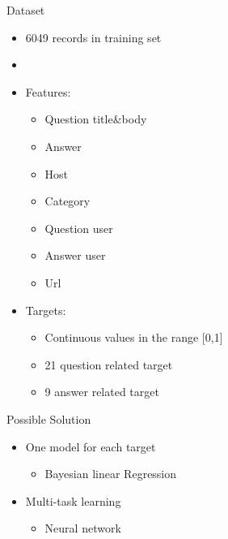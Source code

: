 \documentclass[
 size=12pt,
 paper=smartboard, %
 mode=present, %
 display=slides, %
style=tuliplab,
pauseslide,
fleqn,leqno]{powerdot}
\begin{document}
\begin{slide}{Dataset}
    \begin{itemize}
        \item 6049 records in training set
        \item 
        \item Features:
        \begin{itemize}
            \item Question title\&body
            \item Answer
            \item Host
            \item Category
            \item Question user
            \item Answer user
            \item Url
        \end{itemize}
        \item Targets:
        \begin{itemize}
            \item Continuous values in the range [0,1]
            \item 21 question related target
            \item 9 answer related target
        \end{itemize}
    \end{itemize}
\end{slide}
\begin{slide}{Possible Solution}
    \begin{itemize}
        \item One model for each target
        \begin{itemize}
            \item Bayesian linear Regression
        \end{itemize}
        \item Multi-task learning
        \begin{itemize}
            \item Neural network
        \end{itemize}
    \end{itemize}
\end{slide}
\end{document}
